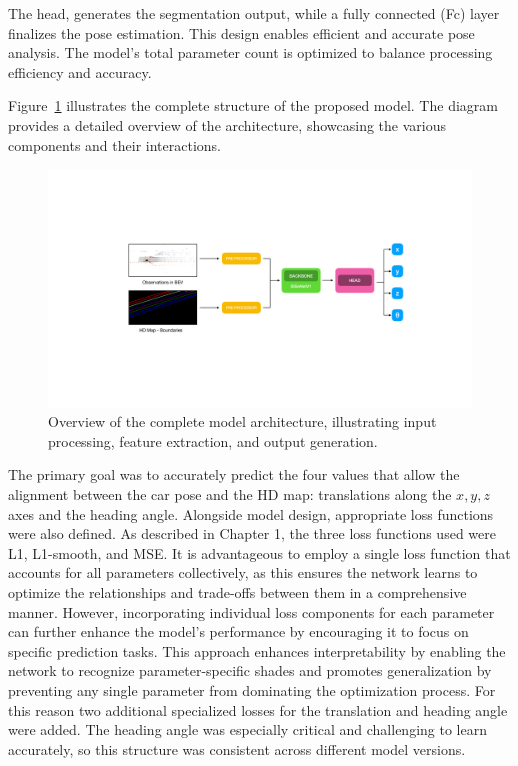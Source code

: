 The head, generates the segmentation output, while a fully connected (Fc) layer finalizes the pose estimation. This design enables efficient and accurate pose analysis. The model’s total parameter count is optimized to balance processing efficiency and accuracy.

Figure~\ref{fig:model1} illustrates the complete structure of the proposed model. The diagram provides a detailed overview of the architecture, showcasing the various components and their interactions. 
\begin{figure}[H]
    \centering
    \includegraphics[width=1\linewidth]{LateX//figs/model1.pdf}
    \caption{Overview of the complete model architecture, illustrating input processing, feature extraction, and output generation.}
    \label{fig:model1}
\end{figure}


The primary goal was to accurately predict the four values that allow the alignment between the car pose and the HD map: translations along the \( x, y, z \) axes and the heading angle. Alongside model design, appropriate loss functions were also defined. As described in Chapter 1, the three loss functions used were L1, L1-smooth, and MSE.
It is advantageous to employ a single loss function that accounts for all parameters collectively, as this ensures the network learns to optimize the relationships and trade-offs between them in a comprehensive manner. However, incorporating individual loss components for each parameter can further enhance the model's performance by encouraging it to focus on specific prediction tasks. This approach enhances interpretability by enabling the network to recognize parameter-specific shades and promotes generalization by preventing any single parameter from dominating the optimization process. For this reason two additional specialized losses for the translation and heading angle were added. 
The heading angle was especially critical and challenging to learn accurately, so this structure was consistent across different model versions.

